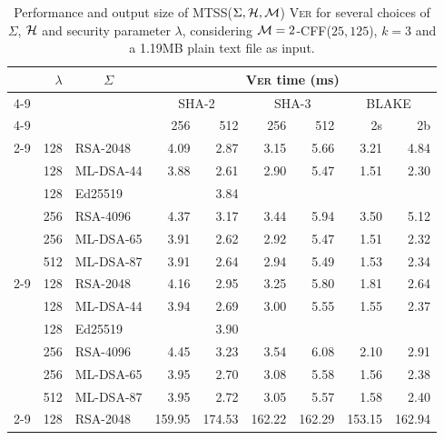\begin{table}[ht]
  \setlength{\tabcolsep}{7pt}
  \centering
  \caption{Performance and output size of \textsc{MTSS}($\Sigma, \mathcal{H}, \mathcal{M}$) \textsc{Ver} for several choices of $\Sigma$, $\mathcal{H}$ and security parameter $\lambda$, considering $\mathcal{M} = 2$-CFF($25, 125$), $k = 3$ and a 1.19MB plain text file as input.}
  \begin{tabular}{crlrrrrrr}
    \toprule
    &
    \multicolumn{1}{r}{\multirow{5}{*}{$\lambda$}}
        & \multicolumn{1}{c}{\multirow{5}{*}{$\Sigma$}}
        & \multicolumn{6}{c}{\textsc{Ver} time (ms)} \\
    \cmidrule{4-9}
    & &
        & \multicolumn{2}{c}{SHA-2}
        & \multicolumn{2}{c}{SHA-3}
        & \multicolumn{2}{c}{BLAKE} \\
    \cmidrule{4-9}
    & & & 256 & 512 & 256 & 512 & 2s & 2b \\
    \cmidrule{2-9}
    \multirow{6}{*}{\rotatebox[origin=c]{90}{Raw $\Sigma$}}
    & 128 & RSA-2048         & 4.09 & 2.87 & 3.15 & 5.66 & 3.21 & 4.84   \\
    & 128 & ML-DSA-44        & 3.88 & 2.61 & 2.90 & 5.47 & 1.51 & 2.30   \\
    & 128 & Ed25519          &      & 3.84 &      &      &      &        \\
    & 256 & RSA-4096         & 4.37 & 3.17 & 3.44 & 5.94 & 3.50 & 5.12   \\
    & 256 & ML-DSA-65        & 3.91 & 2.62 & 2.92 & 5.47 & 1.51 & 2.32   \\
    & 512 & ML-DSA-87        & 3.91 & 2.64 & 2.94 & 5.49 & 1.53 & 2.34   \\
    \cmidrule{2-9}
    \multirow{6}{*}{\rotatebox[origin=c]{90}{\textsc{MTSS} ($|I| = 0$)}}
    & 128 & RSA-2048         & 4.16 & 2.95 & 3.25 & 5.80 & 1.81 & 2.64  \\
    & 128 & ML-DSA-44        & 3.94 & 2.69 & 3.00 & 5.55 & 1.55 & 2.37  \\
    & 128 & Ed25519          &      & 3.90 &      &      &      &       \\
    & 256 & RSA-4096         & 4.45 & 3.23 & 3.54 & 6.08 & 2.10 & 2.91  \\
    & 256 & ML-DSA-65        & 3.95 & 2.70 & 3.08 & 5.58 & 1.56 & 2.38  \\
    & 512 & ML-DSA-87        & 3.95 & 2.72 & 3.05 & 5.57 & 1.58 & 2.40  \\
    \cmidrule{2-9}
    \multirow{6}{*}{\rotatebox[origin=c]{90}{\textsc{MTSS} ($|I| = 1$)}} 
    & 128 & RSA-2048         & 159.95 & 174.53 & 162.22 & 162.29 & 153.15 & 162.94   \\

\end{tabular}
\end{table}
